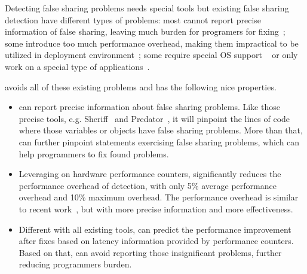 Detecting false sharing problems needs special tools but existing false sharing detection have different types of problems: most cannot report precise information of false sharing, leaving much burden for programers for fixing~\cite{falseshare:binaryinstrumentation1,detect:ptu,detect:intel,falseshare:binaryinstrumentation2,DProf, qinzhao, OSdetection, mldetect, Wicaksono11detectingfalse, openmp}; some introduce too much performance overhead, making them impractical to be utilized in deployment environment~\cite{falseshare:binaryinstrumentation1,falseshare:binaryinstrumentation2,falseshare:simulator, Predator}; some require special OS support ~\cite{OSdetection} or only work on a special type of applications~\cite{sheriff}.

\vspace{0.2in}

\cheetah{} avoids all of these existing problems and has the following nice properties.

\begin{itemize} 
\item \cheetah{} can report precise information about false sharing problems. Like those precise tools, e.g. Sheriff~\cite{sheriff} and Predator~\cite{Predator}, it will pinpoint the lines of code where those variables or objects have false sharing problems. More than that, \cheetah{} can further pinpoint statements exercising false sharing problems, which can help programmers to fix found problems. 

\item Leveraging on hardware performance counters, \cheetah{} significantly reduces the performance overhead of detection, with only 5\% average performance overhead and 10\% maximum overhead. The performance overhead is similar to recent work~\cite{mldetect, openmp}, but with more precise information and more effectiveness.
  
\item Different with all existing tools, \Cheetah{} can predict the performance improvement after fixes based on latency information provided by performance counters. Based on that, \Cheetah{} can avoid reporting those insignificant problems, further reducing programmers burden. 

\end{itemize}





